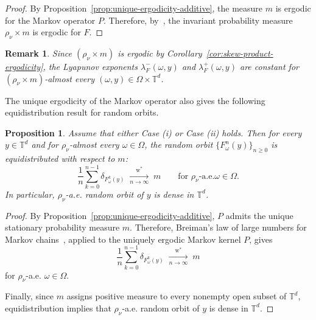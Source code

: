 \documentclass[a4paper,12pt,reqno]{amsart}
\numberwithin{equation}{section}
\newtheorem{proposition}[theorem]{Proposition}
\newtheorem{remark}[theorem]{Remark}
\newcommand{\Tt}{{\mathbb{T}}}
\begin{document}
\begin{proof}
By Proposition~\ref{prop:unique-ergodicity-additive}, the measure $m$ is ergodic for the Markov operator $P$. Therefore, by~\cite[Proposition~5.13]{Viana:2014uo}, the invariant probability measure $\rho_\nu\times m$ is ergodic for $F$.
\end{proof}

\begin{remark}
\label{rem:ergodic}
Since $(\rho_\nu\times m)$ is ergodic by Corollary~\ref{cor:skew-product-ergodicity}, the Lyapunov exponents $\lambda_F^-(\omega,y)$ and $\lambda_F^+(\omega,y)$ are constant for $(\rho_\nu\times m)$-almost every $(\omega,y)\in\Omega\times\Tt^d$.
\end{remark}

The unique ergodicity of the Markov operator also gives the following equidistribution result for random orbits.

\begin{proposition}
\label{pr:equidistribution}
Assume that either Case (i) or Case (ii) holds. Then for every $y\in\Tt^d$ and for $\rho_\nu$-almost every $\omega\in\Omega$, the random orbit $\{F_\omega^n(y)\}_{n\geq 0}$ is equidistributed with respect to $m$:
\[
\frac{1}{n}\sum_{k=0}^{n-1}\delta_{F_\omega^k(y)}
\;\xrightarrow[n\to\infty]{\mathrm{w}^*}\;
m \qquad \text{for } \rho_\nu \text{-a.e.} \omega\in\Omega.
\]
In particular, $\rho_\nu$-a.e. random orbit of $y$ is dense in $\Tt^d$.
\end{proposition}

\begin{proof}
By Proposition~\ref{prop:unique-ergodicity-additive}, $P$ admits the unique stationary probability measure $m$. Therefore, Breiman's law of large numbers for Markov chains~\cite[Corollary~2.7]{BenoistQuint}, applied to the uniquely ergodic Markov kernel $P$, gives
\[
\frac{1}{n}\sum_{k=0}^{n-1}\delta_{F_\omega^k(y)}
\;\xrightarrow[n\to\infty]{\mathrm{w}^*}\;
m
\]
for $\rho_\nu$-a.e. $\omega\in\Omega$.

Finally, since $m$ assigns positive measure to every nonempty open subset of $\Tt^d$, equidistribution implies that $\rho_\nu$-a.e. random orbit of $y$ is dense in $\Tt^d$.
\end{proof}


\end{document}
